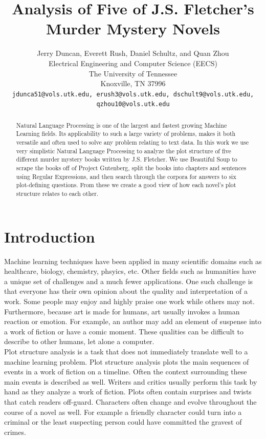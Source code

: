 \documentclass{article}
\title{Analysis of Five of J.S. Fletcher's Murder Mystery Novels}
\author{
 Jerry Duncan, Everett Rush, Daniel Schultz, and Quan Zhou\\
  Electrical Engineering and Computer Science (EECS)\\
  The University of Tennessee\\
  Knoxville, TN 37996 \\
  \texttt{jdunca51@vols.utk.edu, erush3@vols.utk.edu, dschult9@vols.utk.edu, qzhou10@vols.utk.edu} \\
  }
\begin{document}
\maketitle
\begin{abstract}
  Natural Language Processing is one of the largest and fastest growing Machine Learning fields. Its applicability to such a large variety of problems, makes it both versatile and often used to solve any problem relating to text data. In this work we use very simplistic Natural Language Processing to analyze the plot structure of five different murder mystery books written by J.S. Fletcher. We use Beautiful Soup to scrape the books off of Project Gutenberg, split the books into chapters and sentences using Regular Expressions, and then search through the corpora for answers to six plot-defining questions. From these we create a good view of how each novel's plot structure relates to each other.
\end{abstract}




\section{Introduction}

Machine learning techniques have been applied in many scientific domains such as healthcare, biology, chemistry, phsyics, etc. Other fields such as humanities have a unique set of challenges and a much fewer applications. One such challenge is that everyone has their own opinion about the quality and interpretation of a work. Some people may enjoy and highly praise one work while others may not. Furthermore, because art is made for humans, art usually invokes a human reaction or emotion. For example, an author may add an element of suspense into a work of fiction or have a comic moment. These qualities can be difficult to describe to other humans, let alone a computer. \\

Plot structure analysis is a task that does not immediately translate well to a machine learning problem. Plot structure analysis plots the main sequences of events in a work of fiction on a timeline. Often the context surrounding these main events is described as well. Writers and critics usually perform this task by hand as they analyze a work of fiction. Plots often contain surprises and twists that catch readers off-guard. Characters often change and evolve throughout the course of a novel as well. For example a friendly character could turn into a criminal or the least suspecting person could have committed the gravest of crimes. \\
\end{document}
